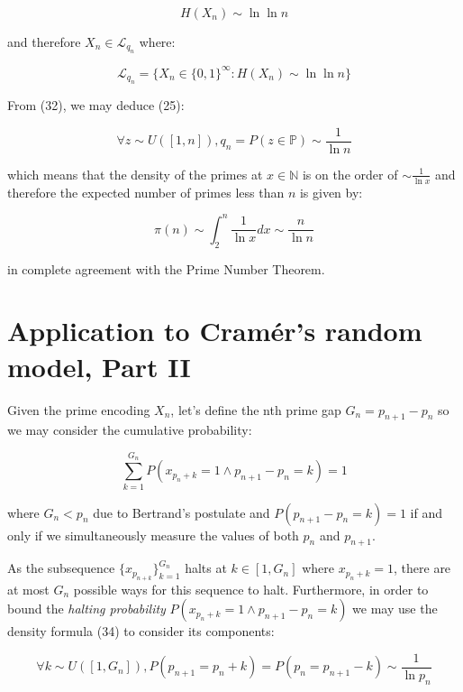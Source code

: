 \documentclass{article}
\begin{document}
\begin{equation}
H(X_n) \sim \ln \ln n
\end{equation}

and therefore $X_n \in \mathcal{L}_{q_n}$ where:

\begin{equation}
\mathcal{L}_{q_n} = \{X_n \in \{0,1\}^{\infty}: H(X_n) \sim \ln\ln n \}
\end{equation}

From (32), we may deduce (25):

\begin{equation}
\forall z \sim U([1,n]), q_n = P(z \in \mathbb{P}) \sim \frac{1}{\ln n}
\end{equation}

which means that the density of the primes at $x \in \mathbb{N}$ is on the order 
of $\sim \frac{1}{\ln x}$ and therefore the expected number of primes less than $n$ is given by: 

\begin{equation}
\pi(n) \sim \int_{2}^n \frac{1}{\ln x} dx \sim \frac{n}{\ln n}
\end{equation}

in complete agreement with the Prime Number Theorem. 

\newpage 

\section{Application to Cramér's random model, Part II}

Given the prime encoding $X_n$, let's define the nth prime gap $G_n=p_{n+1}-p_n$ so we may consider the cumulative probability:

\begin{equation}
\sum_{k=1}^{G_n} P(x_{p_n + k} = 1 \land p_{n+1}-p_n = k) = 1
\end{equation}

where $G_n < p_n$ due to Bertrand's postulate and $P(p_{n+1}-p_n=k) = 1$ if and only if we simultaneously measure the values of both $p_n$ and $p_{n+1}$.

As the subsequence $\{x_{p_{n+k}}\}_{k=1}^{G_n}$ halts at $k \in [1,G_n]$ where $x_{p_n+k}=1$, there are at most $G_n$ possible
ways for this sequence to halt. Furthermore, in order to bound the \textit{halting probability} $P(x_{p_n + k} = 1 \land p_{n+1}-p_n = k)$ we may use the density formula (34) to consider its components:

\begin{equation}
\forall k \sim U([1,G_n]), P(p_{n+1} = p_n + k) = P(p_n = p_{n+1} -k) \sim \frac{1}{\ln p_n}
\end{equation}
\end{document}
